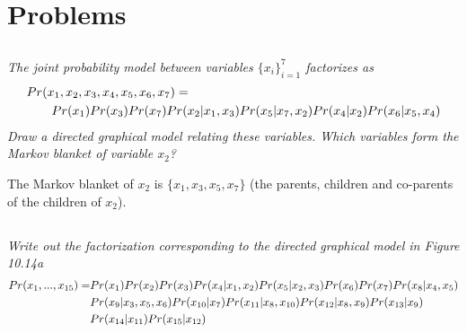 \documentclass[11pt]{report}
\begin{document}
\chapter{Problems}
\section{}
\textit{The joint probability model between variables $\{x_i\}_{i=1}^7$ factorizes as}
\begin{equation} 
\begin{aligned}
&Pr(x_1, x_2, x_3, x_4, x_5, x_6, x_7) = \\
&\quad \quad Pr(x_1) Pr(x_3) Pr(x_7) Pr(x_2 | x_1, x_3) Pr(x_5 | x_7, x_2) Pr(x_4 | x_2) Pr (x_6 | x_5, x_4) \notag
\end{aligned}
\end{equation}
\textit{Draw a directed graphical model relating these variables. Which variables form the Markov blanket of variable $x_2$?}
\begin{figure}[h]
\end{figure}

The Markov blanket of $x_2$ is $\{x_1, x_3, x_5, x_7 \}$ (the parents, children and co-parents of the children of $x_2$).
\FloatBarrier

\section{}
\textit{Write out the factorization corresponding to the directed graphical model in Figure 10.14a }
\begin{equation} 
\begin{aligned}
Pr(x_1, ..., x_{15}) = &Pr(x_1) Pr(x_2) Pr(x_3) Pr(x_4 | x_1, x_2) Pr(x_5 | x_2, x_3) Pr(x_6) Pr(x_7) Pr(x_8 | x_4, x_5) \\
    & Pr(x_9 | x_3, x_5, x_6) Pr(x_{10} | x_7) Pr(x_{11} | x_8, x_{10}) Pr(x_{12} | x_8, x_9) Pr(x_{13} | x_9) \\
    & Pr(x_{14} | x_{11}) Pr(x_{15} | x_{12}) \notag
\end{aligned} 
\end{equation}
\end{document}

